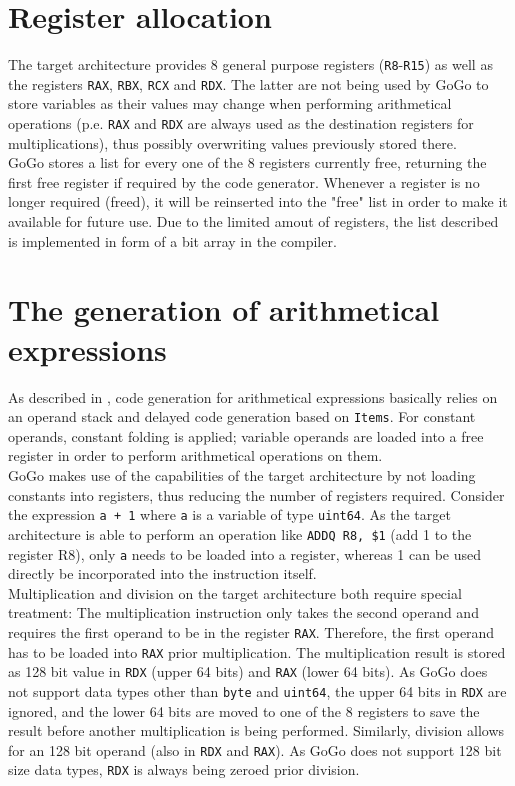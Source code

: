 \documentclass[a4paper]{scrreprt}
\begin{document}
    \section{Register allocation}
        The target architecture provides 8 general purpose registers (\texttt{R8}-\texttt{R15}) as well as the registers \texttt{RAX}, \texttt{RBX}, \texttt{RCX} and \texttt{RDX}\cite{int09}. The latter are not being used by GoGo to store variables as their values may change when performing arithmetical operations (p.e. \texttt{RAX} and \texttt{RDX} are always used as the destination registers for multiplications), thus possibly overwriting values previously stored there.\\
        GoGo stores a list for every one of the 8 registers currently free, returning the first free register if required by the code generator. Whenever a register is no longer required (freed), it will be reinserted into the "free" list in order to make it available for future use. Due to the limited amout of registers, the list described is implemented in form of a bit array in the compiler.

    \section{The generation of arithmetical expressions}
      As described in \cite{wir96}, code generation for arithmetical expressions basically relies on an operand stack and delayed code generation based on \texttt{Items}. For constant operands, constant folding is applied; variable operands are loaded into a free register in order to perform arithmetical operations on them.\\
      GoGo makes use of the capabilities of the target architecture by not loading constants into registers, thus reducing the number of registers required. Consider the expression \texttt{a + 1} where \texttt{a} is a variable of type \texttt{uint64}. As the target architecture is able to perform an operation like \texttt{ADDQ R8, \$1} (add 1 to the register R8), only \texttt{a} needs to be loaded into a register, whereas 1 can be used directly be incorporated into the instruction itself.\\
      Multiplication and division on the target architecture both require special treatment: The multiplication instruction only takes the second operand and requires the first operand to be in the register \texttt{RAX}\cite{int09}. Therefore, the first operand has to be loaded into \texttt{RAX} prior multiplication. The multiplication result is stored as 128 bit value in \texttt{RDX} (upper 64 bits) and \texttt{RAX} (lower 64 bits). As GoGo does not support data types other than \texttt{byte} and \texttt{uint64}, the upper 64 bits in \texttt{RDX} are ignored, and the lower 64 bits are moved to one of the 8 registers to save the result before another multiplication is being performed. Similarly, division allows for an 128 bit operand (also in \texttt{RDX} and \texttt{RAX}). As GoGo does not support 128 bit size data types, \texttt{RDX} is always being zeroed prior division.
\end{document}
